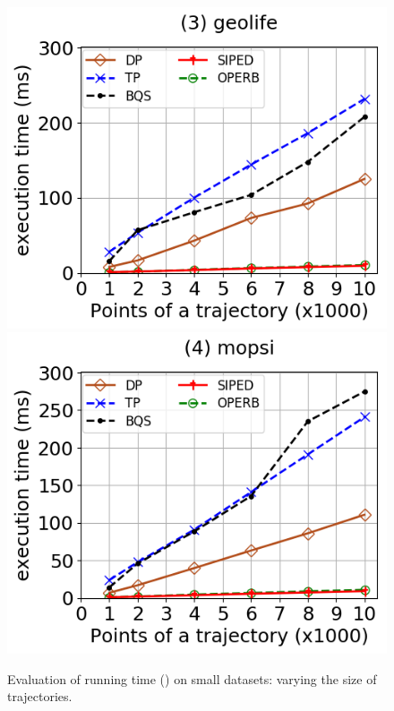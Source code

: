 \begin{figure}[tb!]
	\includegraphics[scale=0.315]{Figures/Exp-PED-time-size-geolife.png}	\hspace{1ex}
	\includegraphics[scale=0.315]{Figures/Exp-PED-time-size-mopsi.png}	\hspace{1ex}
	\vspace{-3ex}
	\caption{\small Evaluation of running time (\ped) on small datasets: varying the size of trajectories.}\label{fig:time-size-ped}
	\vspace{-2ex}
\end{figure}

